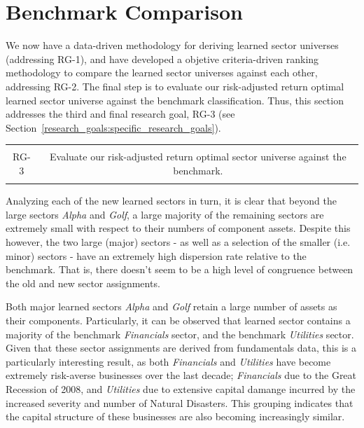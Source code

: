 \documentclass[../main.tex]{subfiles}
\begin{document}
\chapter{Benchmark Comparison}

We now have a data-driven methodology for deriving learned sector universes (addressing RG-1), and have developed a objetive criteria-driven ranking methodology to compare the learned sector universes against each other, addressing RG-2. The final step is to evaluate our risk-adjusted return optimal learned sector universe against the benchmark classification. Thus, this section addresses the third and final research goal, RG-3 (see Section~\ref{research_goals:specific_research_goals}).

\begin{table}[h!]
    \centering
    \begin{tabular}{| c | c |}
        \hline
        &  \\
        RG-3 & Evaluate our risk-adjusted return optimal sector universe against the benchmark. \\
        & \\
        \hline
    \end{tabular}
\end{table}



Analyzing each of the new learned sectors in turn, it is clear that beyond the large sectors \textit{Alpha} and \textit{Golf}, a large majority of the remaining sectors are extremely small with respect to their numbers of component assets. Despite this however, the two large (major) sectors - as well as a selection of the smaller (i.e. minor) sectors - have an extremely high dispersion rate relative to the benchmark. That is, there doesn't seem to be a high level of congruence between the old and new sector assignments.

Both major learned sectors \textit{Alpha} and \textit{Golf} retain a large number of assets as their components. Particularly, it can be observed that learned sector  contains a majority of the benchmark \textit{Financials} sector, and the benchmark \textit{Utilities} sector. Given that these sector assignments are derived from fundamentals data, this is a particularly interesting result, as both \textit{Financials} and \textit{Utilities} have become extremely risk-averse businesses over the last decade; \textit{Financials} due to the Great Recession of 2008, and \textit{Utilities} due to extensive capital damange incurred by the increased severity and number of Natural Disasters. This grouping indicates that the capital structure of these businesses are also becoming increasingly similar.
\end{document}
